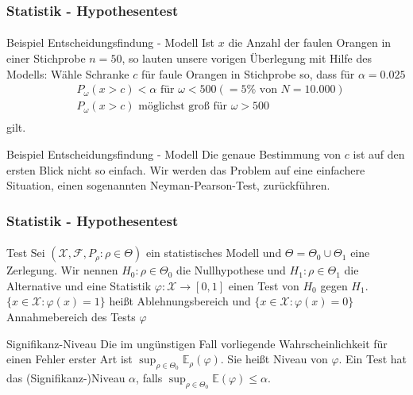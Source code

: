 \documentclass{beamer}
\begin{document}
\begin{frame}
    \frametitle{Statistik - Hypothesentest}
\framesubtitle{}
\begin{block}{Beispiel Entscheidungsfindung - Modell}
Ist $x$ die Anzahl der faulen Orangen in einer Stichprobe $n = 50$, so lauten unsere vorigen Überlegung mit Hilfe des Modells: Wähle Schranke $c$ für faule Orangen in Stichprobe so,  dass für $\alpha = 0.025$
\begin{align*}
& P_\omega( x >c) < \alpha  \text{ für } \omega < 500 (= 5 \% \text{ von } N = 10.000) \\
& P_\omega( x >c) \text{ möglichst groß für } \omega > 500\\
\end{align*}
gilt.
\end{block}

\begin{block}{Beispiel Entscheidungsfindung - Modell}
Die genaue Bestimmung von $c$ ist auf den ersten Blick nicht so einfach. Wir werden das Problem auf eine einfachere Situation, einen sogenannten Neyman-Pearson-Test, zurückführen. 
\end{block}


 \end{frame}


\begin{frame}
    \frametitle{Statistik - Hypothesentest}
\framesubtitle{}
\begin{block}{Test}
Sei   $(\mathcal{X}, \mathcal{F}, P_\rho :  \rho \in \Theta)$ ein statistisches Modell und $ \Theta =  \Theta_0 \cup  \Theta_1$ eine Zerlegung.  Wir nennen $H_0 : \rho \in \Theta_0$ die Nullhypothese und  $H_1 : \rho \in \Theta_1$ die Alternative 
und eine Statistik $\varphi: \mathcal{X} \to [0,1]$ einen Test von $H_0$ gegen $H_1$. $\{ x \in \mathcal{X}  : \varphi(x) = 1\}$ heißt Ablehnungsbereich und  $\{ x \in \mathcal{X}  : \varphi(x) = 0\}$   Annahmebereich des Tests $\varphi$
\end{block}


\begin{block}{Signifikanz-Niveau}
Die im ungünstigen Fall vorliegende Wahrscheinlichkeit für einen Fehler erster Art ist $\sup_{\rho \in \Theta_0} \mathbb{E}_{\rho}(\varphi)$. Sie heißt Niveau von $\varphi$.  Ein Test hat das (Signifikanz-)Niveau $\alpha$, falls  $\sup_{\rho \in \Theta_0} \mathbb{E}(\varphi) \leq \alpha$.
\end{block}
 \end{frame}
\end{document}
